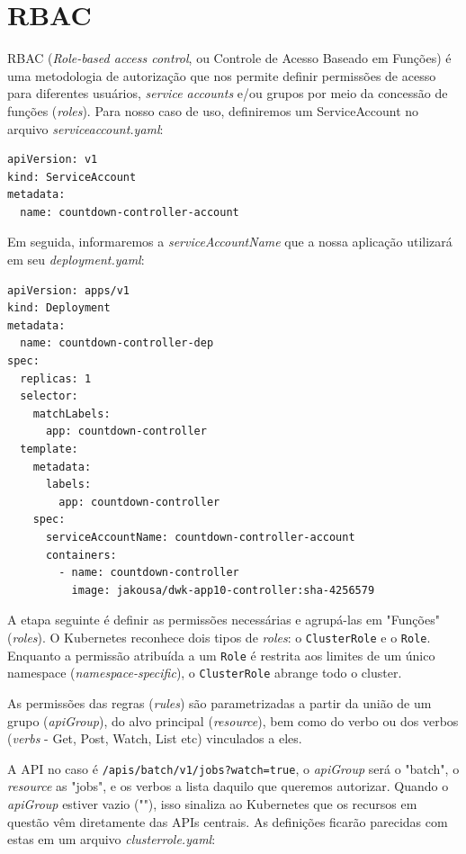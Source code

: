 \documentclass[11pt,a4paper]{article}
\begin{document}
\section*{\color{primary}RBAC}
RBAC (\textit{Role-based access control}, ou Controle de Acesso Baseado em Funções) é uma metodologia de autorização que nos permite definir permissões de acesso para diferentes usuários, \textit{service accounts} e/ou grupos por meio da concessão de funções (\textit{roles}). Para nosso caso de uso, definiremos um ServiceAccount no arquivo \textit{serviceaccount.yaml}:

\begin{lstlisting}[language=bash]
apiVersion: v1
kind: ServiceAccount
metadata:
  name: countdown-controller-account
\end{lstlisting}

Em seguida, informaremos a \textit{serviceAccountName} que a nossa aplicação utilizará em seu \textit{deployment.yaml}:

\begin{lstlisting}[language=bash]
apiVersion: apps/v1
kind: Deployment
metadata:
  name: countdown-controller-dep
spec:
  replicas: 1
  selector:
    matchLabels:
      app: countdown-controller
  template:
    metadata:
      labels:
        app: countdown-controller
    spec:
      serviceAccountName: countdown-controller-account
      containers:
        - name: countdown-controller
          image: jakousa/dwk-app10-controller:sha-4256579
\end{lstlisting}

A etapa seguinte é definir as permissões necessárias e agrupá-las em "Funções" (\textit{roles}). O Kubernetes reconhece dois tipos de \textit{roles}: o \texttt{ClusterRole} e o \texttt{Role}. Enquanto a permissão atribuída a um \texttt{Role} é restrita aos limites de um único namespace (\textit{namespace-specific}), o \texttt{ClusterRole} abrange todo o cluster.

As permissões das regras (\textit{rules}) são parametrizadas a partir da união de um grupo (\textit{apiGroup}), do alvo principal (\textit{resource}), bem como do verbo ou dos verbos (\textit{verbs} - Get, Post, Watch, List etc) vinculados a eles.

A API no caso é \texttt{/apis/batch/v1/jobs?watch=true}, o \textit{apiGroup} será o "batch", o \textit{resource} as "jobs", e os verbos a lista daquilo que queremos autorizar. Quando o \textit{apiGroup} estiver vazio (""), isso sinaliza ao Kubernetes que os recursos em questão vêm diretamente das APIs centrais. As definições ficarão parecidas com estas em um arquivo \textit{clusterrole.yaml}:
\end{document}

